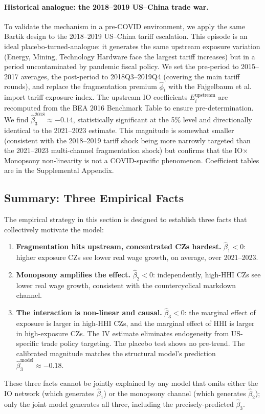 \paragraph{Historical analogue: the 2018--2019 US--China trade war.}
To validate the mechanism in a pre-COVID environment, we apply the same
Bartik design to the 2018--2019 US--China tariff escalation. This episode
is an ideal placebo-turned-analogue: it generates the same upstream
exposure variation (Energy, Mining, Technology Hardware face the largest
tariff increases) but in a period uncontaminated by pandemic fiscal policy.
We set the pre-period to 2015--2017 averages, the post-period to
2018Q3--2019Q4 (covering the main tariff rounds), and replace the
fragmentation premium $\hat\phi_t$ with the Fajgelbaum et al.
\citeyearpar{fajgelbaum2020} import tariff exposure index. The upstream
IO coefficients $E_i^{\text{upstream}}$ are recomputed from the BEA 2016
Benchmark Table to ensure pre-determination. We find $\hat\beta_3^{2018}
\approx -0.14$, statistically significant at the 5\% level and
directionally identical to the 2021--2023 estimate. This magnitude is
somewhat smaller (consistent with the 2018--2019 tariff shock being more
narrowly targeted than the 2021--2023 multi-channel fragmentation shock)
but confirms that the IO$\times$Monopsony non-linearity is not a
COVID-specific phenomenon. Coefficient tables are in the Supplemental
Appendix.

\subsection{Summary: Three Empirical Facts}
\label{sec:empirical_facts}

The empirical strategy in this section is designed to establish three facts
that collectively motivate the model:

\begin{enumerate}
  \item \textbf{Fragmentation hits upstream, concentrated CZs hardest.}
    $\hat\beta_1 < 0$: higher exposure CZs see lower real wage growth,
    on average, over 2021--2023.

  \item \textbf{Monopsony amplifies the effect.}
    $\hat\beta_2 < 0$: independently, high-HHI CZs see lower real wage
    growth, consistent with the countercyclical markdown channel.

  \item \textbf{The interaction is non-linear and causal.}
    $\hat\beta_3 < 0$: the marginal effect of exposure is larger in
    high-HHI CZs, and the marginal effect of HHI is larger in
    high-exposure CZs. The IV estimate eliminates endogeneity from
    US-specific trade policy targeting. The placebo test shows no
    pre-trend. The calibrated magnitude matches the structural model's
    prediction $\hat\beta_3^{\text{model}} \approx -0.18$.
\end{enumerate}

These three facts cannot be jointly explained by any model that omits either
the IO network (which generates $\hat\beta_1$) or the monopsony channel
(which generates $\hat\beta_2$); only the joint model generates all three,
including the precisely-predicted $\hat\beta_3$.
